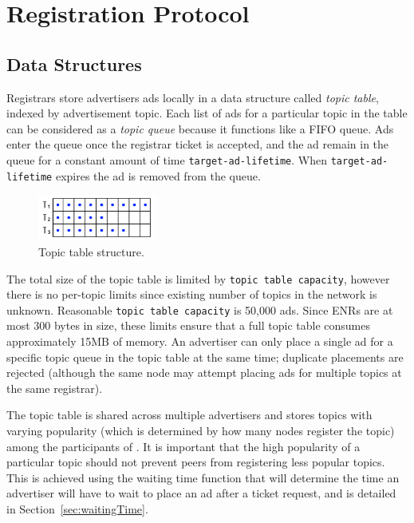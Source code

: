 \section{Registration Protocol}\label{sec:registration_single}

\subsection{Data Structures}
Registrars store advertisers ads locally in a data structure called \emph{topic table}, 
indexed by advertisement topic. 
Each list of ads for a particular topic in the table  can be considered as a \emph{topic queue} because it functions like a FIFO queue.
Ads enter the queue once the registrar ticket is accepted,  and
the ad remain in the queue for a constant amount of time \texttt{target-ad-lifetime}. 
When \texttt{target-ad-lifetime} expires the ad is removed  from the queue.

\begin{figure}
    \includegraphics[width=0.35\textwidth]{img/topic-queue-diagram.png}
    \caption{Topic table structure.}
    \label{fig:topic_table}
 \end{figure}

The total size of the topic table is limited by \texttt{topic table capacity},  however there is no per-topic limits since existing number of topics in the network is unknown. 
Reasonable \texttt{topic table capacity} is 50,000 ads. 
Since ENRs are at most 300 bytes in size, these limits ensure that a full topic table consumes approximately 15MB of memory.
An advertiser can only place a single ad for a specific topic queue in the topic table at the same time; duplicate placements are rejected (although the same node may attempt placing ads for multiple topics at the same registrar).

The topic table is shared across multiple advertisers and stores topics with varying popularity (which is determined by how many nodes register the topic) among the participants of \sysname. 
It is important that the high popularity of a particular topic should not prevent peers from registering less popular topics. 
This is achieved using the waiting time function that will determine the time an advertiser will have to wait to place an ad after a ticket request,  and is detailed in Section~\ref{sec:waitingTime}.

